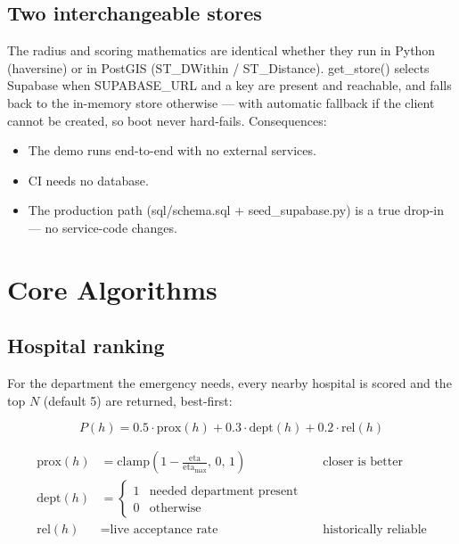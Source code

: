 \documentclass[11pt]{article}
\newcommand{\code}[1]{\colorbox{ghCodeBg}{\ttfamily\small #1}}
\begin{document}
\subsection{Two interchangeable stores}
The radius and scoring mathematics are identical whether they run in Python
(haversine) or in PostGIS (\code{ST\_DWithin} / \code{ST\_Distance}). \code{get\_store()}
selects Supabase when \code{SUPABASE\_URL} and a key are present and reachable, and
falls back to the in-memory store otherwise --- with automatic fallback if the
client cannot be created, so boot never hard-fails. Consequences:

\begin{itemize}
  \item The demo runs end-to-end with no external services.
  \item CI needs no database.
  \item The production path (\code{sql/schema.sql} + \code{seed\_supabase.py}) is a true drop-in --- no service-code changes.
\end{itemize}

\section{Core Algorithms}

\subsection{Hospital ranking}
For the department the emergency needs, every nearby hospital is scored and the
top $N$ (default 5) are returned, best-first:

\begin{equation*}
P(h) = 0.5 \cdot \mathrm{prox}(h) + 0.3 \cdot \mathrm{dept}(h) + 0.2 \cdot \mathrm{rel}(h)
\end{equation*}

\begin{align*}
\mathrm{prox}(h) &= \mathrm{clamp}\!\left(1 - \frac{\mathrm{eta}}{\mathrm{eta_{max}}},\, 0,\, 1\right) && \text{closer is better}\\
\mathrm{dept}(h) &= \begin{cases} 1 & \text{needed department present} \\ 0 & \text{otherwise} \end{cases} \\
\mathrm{rel}(h)  &= \text{live acceptance rate} && \text{historically reliable}
\end{align*}
\end{document}
